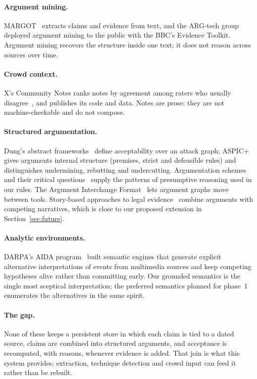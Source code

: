 \documentclass[11pt]{article}
\begin{document}
\paragraph{Argument mining.}
MARGOT~\cite{margot} extracts claims and evidence from text, and the
ARG-tech group deployed argument mining to the public with the BBC's
Evidence Toolkit. Argument mining recovers the structure inside one
text; it does not reason across sources over time.

\paragraph{Crowd context.}
X's Community Notes ranks notes by agreement among raters who usually
disagree~\cite{birdwatch}, and publishes its code and data. Notes are
prose: they are not machine-checkable and do not compose.

\paragraph{Structured argumentation.}
Dung's abstract frameworks~\cite{dung} define acceptability over an
attack graph; ASPIC+~\cite{aspic} gives arguments internal structure
(premises, strict and defeasible rules) and distinguishes undermining,
rebutting and undercutting. Argumentation schemes and their critical
questions~\cite{walton} supply the patterns of presumptive reasoning
used in our rules. The Argument Interchange Format~\cite{aif} lets
argument graphs move between tools. Story-based approaches to legal
evidence~\cite{bex} combine arguments with competing narratives, which
is close to our proposed extension in Section~\ref{sec:future}.

\paragraph{Analytic environments.}
DARPA's AIDA program~\cite{aida} built semantic engines that generate
explicit alternative interpretations of events from multimedia sources
and keep competing hypotheses alive rather than committing early. Our
grounded semantics is the single most sceptical interpretation; the
preferred semantics planned for phase~1 enumerates the alternatives in
the same spirit.

\paragraph{The gap.}
None of these keeps a persistent store in which each claim is tied to a
dated source, claims are combined into structured arguments, and
acceptance is recomputed, with reasons, whenever evidence is added. That
join is what this system provides; extraction, technique detection and
crowd input can feed it rather than be rebuilt.
\end{document}
